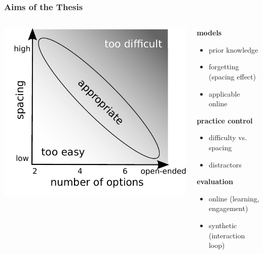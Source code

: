 \documentclass[xcolor=svgnames]{beamer}
\begin{document}
\begin{frame}
	\frametitle{Aims of the Thesis}
	\begin{columns}[onlytextwidth]
		\begin{column}{0.4\textwidth}
			\includegraphics[width=1\textwidth]{figure/options_vs_spacing}
		\end{column}
		\begin{column}{0.55\textwidth}
			\textbf{models}
			\begin{itemize}
				\item prior knowledge
				\item forgetting (spacing effect)
				\item applicable online
			\end{itemize}
			\textbf{practice control}
			\begin{itemize}
				\item difficulty vs. spacing
				\item distractors
			\end{itemize}
			\textbf{evaluation}
			\begin{itemize}
				\item online (learning, engagement)
				\item synthetic (interaction loop)
			\end{itemize}
		\end{column}
	\end{columns}
\end{frame}
\end{document}
